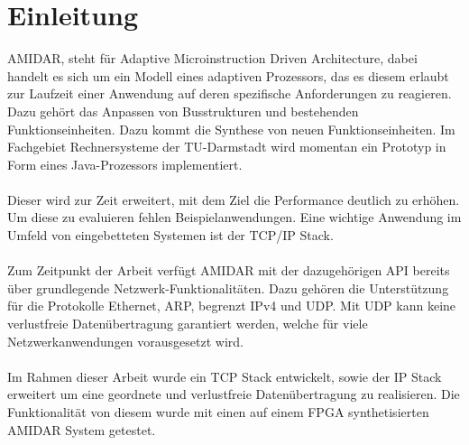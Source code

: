 \chapter{Einleitung}

AMIDAR, steht für Adaptive Microinstruction Driven Architecture, dabei handelt es sich um ein Modell eines adaptiven Prozessors, das es diesem erlaubt zur Laufzeit einer Anwendung auf deren spezifische Anforderungen zu reagieren. Dazu gehört das Anpassen von Busstrukturen und bestehenden Funktionseinheiten. Dazu kommt die Synthese von neuen Funktionseinheiten.
Im Fachgebiet Rechnersysteme der TU-Darmstadt wird momentan ein Prototyp in Form eines Java-Prozessors implementiert. \\\\
Dieser wird zur Zeit erweitert, mit dem Ziel die Performance deutlich zu erhöhen. Um diese zu evaluieren fehlen Beispielanwendungen. Eine wichtige Anwendung im Umfeld von eingebetteten Systemen ist der TCP/IP Stack.\\\\
Zum Zeitpunkt der Arbeit verfügt AMIDAR mit der dazugehörigen API bereits über grundlegende Netzwerk-Funktionalitäten. Dazu gehören die Unterstützung für die Protokolle Ethernet, ARP, begrenzt IPv4 und UDP. Mit UDP kann keine verlustfreie Datenübertragung garantiert werden, welche für viele Netzwerkanwendungen vorausgesetzt wird.\\\\
Im Rahmen dieser Arbeit wurde ein TCP Stack entwickelt, sowie der IP Stack erweitert um eine geordnete und verlustfreie Datenübertragung zu realisieren. Die Funktionalität von diesem wurde mit einen auf einem FPGA synthetisierten AMIDAR System getestet.

